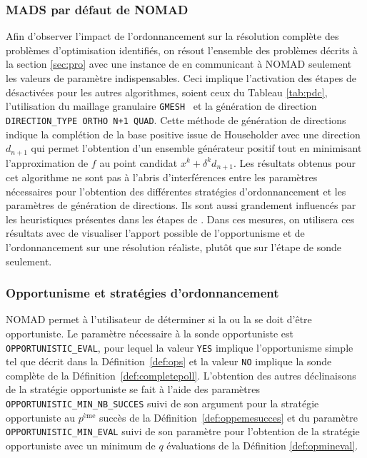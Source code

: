 \subsubsection{MADS par défaut de NOMAD}\label{sec:ntr}
Afin d'observer l'impact de l'ordonnancement sur la résolution complète des problèmes d'optimisation identifiés, on résout l'ensemble des problèmes décrits à la section \ref{sec:pro} avec une instance de \MADS en communicant à NOMAD seulement les valeurs de paramètre indispensables. Ceci implique l'activation des étapes de \SEARCH désactivées pour les autres algorithmes, soient ceux du Tableau \ref{tab:pdc}, l'utilisation du maillage granulaire \texttt{GMESH}~\cite{Le09a} et la génération de direction \texttt{DIRECTION\_TYPE ORTHO N+1 QUAD}. Cette méthode de génération de directions indique la complétion de la base positive issue de Householder avec une direction $d_{n+1}$ qui permet l'obtention d'un ensemble générateur positif tout en minimisant l'approximation de $f$ au point candidat $x^k+\delta^k d_{n+1}$.   
Les résultats obtenus pour cet algorithme ne sont pas à l'abris d'interférences entre les paramètres nécessaires pour l'obtention des différentes stratégies d'ordonnancement et les paramètres de génération de directions. Ils sont aussi grandement influencés par les heuristiques présentes dans les étapes de \SEARCH. Dans ces mesures, on utilisera ces résultats avec de visualiser l'apport possible de l'opportunisme et de l'ordonnancement sur une résolution réaliste, plutôt que sur l'étape de sonde seulement.
\subsubsection{Opportunisme et stratégies d'ordonnancement}\label{sec:mop}
NOMAD permet à l'utilisateur de déterminer si la \POLL ou la \SEARCH se doit d'être opportuniste. Le paramètre nécessaire à la sonde opportuniste est \texttt{OPPORTUNISTIC\_EVAL}, pour lequel la valeur \texttt{YES} implique l'opportunisme simple tel que décrit dans la Définition~\ref{def:ops} et la valeur \texttt{NO} implique la sonde complète de la Définition~\ref{def:completepoll}. L'obtention des autres déclinaisons de la stratégie opportuniste se fait à l'aide des paramètres \texttt{OPPORTUNISTIC\_MIN\_NB\_SUCCES} suivi de son argument pour la stratégie opportuniste au $p^{\text{ème}}$ succès de la Définition~\ref{def:oppemesucces} et du paramètre \texttt{OPPORTUNISTIC\_MIN\_EVAL} suivi de son paramètre pour l'obtention de la stratégie opportuniste avec un minimum de $q$ évaluations de la Définition \ref{def:opmineval}.


